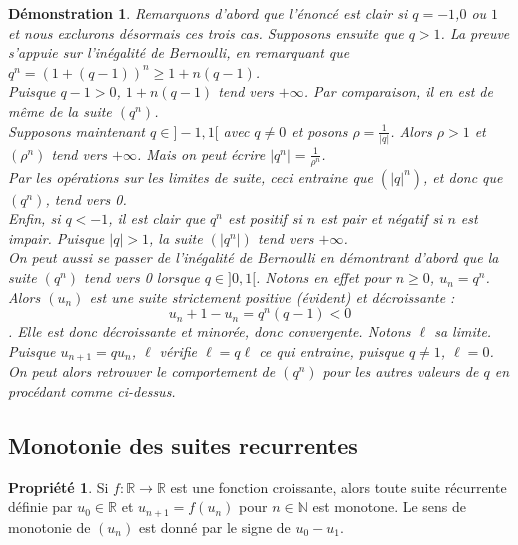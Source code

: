 \documentclass[a4paper,12pt,final]{article}
\newtheorem{Proof}{Démonstration}[section]
\theoremstyle{theorem}
\theoremstyle{definition}
\newtheorem{Propriete}{Propriété}[section]
\theoremstyle{definition}
\theoremstyle{definition}
\begin{document}
\begin{Proof}
	Remarquons d'abord que l'énoncé est clair si $q=−1$,$0$ ou $1$ et nous exclurons désormais ces trois cas. Supposons ensuite que $q>1$. La preuve s'appuie sur l'inégalité de Bernoulli, en remarquant que $q^{n}=(1+(q−1))^{n} \geq 1+n(q−1)$. \\
	Puisque $q−1>0$, $1+n(q−1)$ tend vers $+\infty$. Par comparaison, il en est de même de la suite $(q^{n})$.\\
	
	Supposons maintenant $q \in ]−1,1[$ avec $q \neq 0$ et posons $\rho=\frac{1}{|q|}$. Alors $\rho>1$ et $(\rho^{n})$ tend vers $+\infty$. Mais on peut écrire $|q^{n}|=\frac{1}{\rho^{n}}$. \\
	Par les opérations sur les limites de suite, ceci entraine que $(|q|^{n})$, et donc que $(q^{n})$, tend vers 0. \\
	
	Enfin, si $q<−1$, il est clair que $q^{n}$ est positif si $n$ est pair et négatif si $n$ est impair. Puisque $|q|>1$, la suite $(|q^{n}|)$ tend vers $+\infty$. \\
	
	On peut aussi se passer de l'inégalité de Bernoulli en démontrant d'abord que la suite $(q^{n})$ tend vers 0 lorsque $q \in ]0,1[$. Notons en effet pour $n \geq 0$, $u_{n}=q^{n}$. Alors $(u_{n})$ est une suite strictement positive (évident) et décroissante : 
	\[u_{n}+1−u_{n}=q^{n}(q−1)<0\]. 
	Elle est donc décroissante et minorée, donc convergente. Notons $\ell$ sa limite. Puisque $u_{n+1}=qu_{n}$, $\ell$ vérifie $\ell=q\ell$ ce qui entraine, puisque $q\neq 1$, $\ell=0$. On peut alors retrouver le comportement de $(q^{n})$ pour les autres valeurs de $q$ en procédant comme ci-dessus.
\end{Proof}

	\subsection{Monotonie des suites recurrentes}
	
\begin{Propriete}
	Si $f:\mathbb{R} \rightarrow \mathbb{R}$ est une fonction croissante, alors toute suite récurrente définie par $u_{0} \in \mathbb{R}$ et $u_{n+1}=f(u_{n})$ pour $n \in \mathbb{N}$ est monotone. Le sens de monotonie de $(u_{n})$ est donné par le signe de $u_{0}−u_{1}$. 
\end{Propriete}
\end{document}
